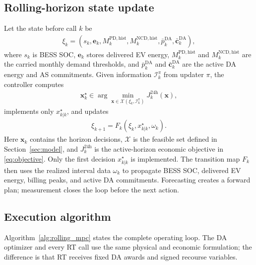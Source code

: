 \documentclass[final,5p,times]{elsarticle}
\newcommand{\DA}{\mathrm{DA}}
\newcommand{\PD}{\mathrm{PD}}
\newcommand{\NCD}{\mathrm{NCD}}
\newcommand{\hist}{\mathrm{hist}}
\begin{document}
\subsection{Rolling-horizon state update}
Let the state before call $k$ be
\begin{align}
\xi_k=\left(s_k,\boldsymbol e_k,M_k^{\PD,\hist},M_k^{\NCD,\hist},
\bar p_k^{\DA},\bar{\boldsymbol c}_k^{\DA}\right),
\label{eq:state_vector_main}
\end{align}
where $s_k$ is BESS SOC, $\boldsymbol e_k$ stores delivered EV energy,
$M_k^{\PD,\hist}$ and $M_k^{\NCD,\hist}$ are the carried monthly demand
thresholds, and $\bar p_k^{\DA}$ and $\bar{\boldsymbol c}_k^{\DA}$ are the
active DA energy and AS commitments. Given information $\mathcal I_k^\pi$
from updater $\pi$, the controller computes
\begin{align}
\boldsymbol x_k^\star\in\arg\min_{\boldsymbol x\in\mathcal X(\xi_k,\mathcal I_k^\pi)}
J_k^{24\mathrm h}(\boldsymbol x),
\label{eq:mpc_problem_main}
\end{align}
implements only $x_{k|k}^\star$, and updates
\begin{align}
\xi_{k+1}=F_k(\xi_k,x_{k|k}^\star,\omega_k).
\label{eq:mpc_update_main}
\end{align}
Here $\boldsymbol x_k$ contains the horizon decisions, $\mathcal X$ is the
feasible set defined in Section~\ref{sec:model}, and $J_k^{24\mathrm h}$ is the
active-horizon economic objective in \eqref{eq:objective}. Only the first
decision $x_{k|k}^\star$ is implemented. The transition map $F_k$ then uses
the realized interval data $\omega_k$ to propagate BESS SOC, delivered EV
energy, billing peaks, and active DA commitments. Forecasting creates a forward
plan; measurement closes the loop before the next action.

\subsection{Execution algorithm}
Algorithm~\ref{alg:rolling_mpc} states the complete operating loop. The DA
optimizer and every RT call use the same physical and economic formulation;
the difference is that RT receives fixed DA awards and signed recourse
variables.
\end{document}
